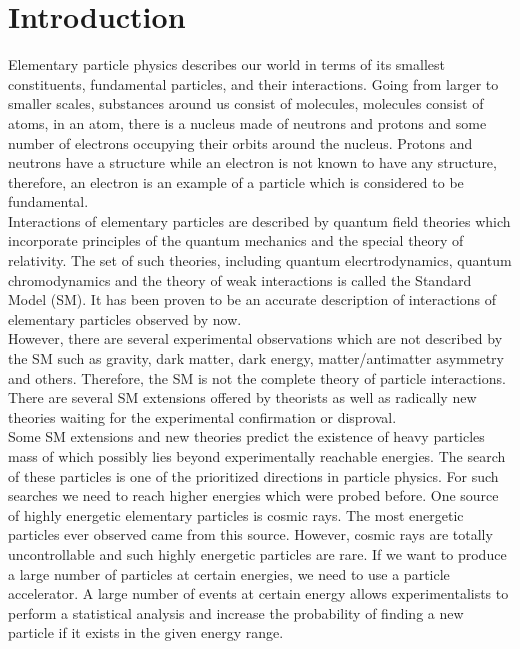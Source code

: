 \section{Introduction}
\label{sec:intro}


Elementary particle physics describes our world in terms of its smallest constituents, fundamental particles, and their interactions. Going from larger to smaller scales, substances around us consist of molecules, molecules consist of atoms, in an atom, there is a nucleus made of neutrons and protons and some number of electrons occupying their orbits around the nucleus. Protons and neutrons have a structure while an electron is not known to have any structure, therefore, an electron is an example of a particle which is considered to be fundamental.\\

Interactions of elementary particles are described by quantum field theories which incorporate principles of the quantum mechanics and the special theory of relativity. The set of such theories, including quantum elecrtrodynamics, quantum chromodynamics and the theory of weak interactions is called the Standard Model (SM). It has been proven to be an accurate description of interactions of elementary particles observed by now.\\ 

However, there are several experimental observations which are not described by the SM such as gravity, dark matter, dark energy, matter/antimatter asymmetry and others. Therefore, the SM is not the complete theory of particle interactions. There are several SM extensions offered by theorists as well as radically new theories waiting for the experimental confirmation or disproval. \\

Some SM extensions and new theories predict the existence of heavy particles mass of which possibly lies beyond experimentally reachable energies. The search of these particles is one of the prioritized directions in particle physics. For such searches we need to reach higher energies which were probed before. One source of highly energetic elementary particles is cosmic rays. The most energetic particles ever observed came from this source. However, cosmic rays are totally uncontrollable and such highly energetic particles are rare. If we want to produce a large number of particles at certain energies, we need to use a particle accelerator. A large number of events at certain energy allows experimentalists to perform a statistical analysis and increase the probability of finding a new particle if it exists in the given energy range.\\

